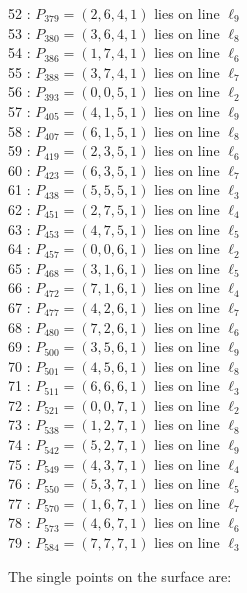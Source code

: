 \documentclass{article}
\begin{document}
{\begin{multicols}{2}
52 : $P_{379}=( 2, 6, 4, 1 )$ lies on line $\ell_{9}$\\
53 : $P_{380}=( 3, 6, 4, 1 )$ lies on line $\ell_{8}$\\
54 : $P_{386}=( 1, 7, 4, 1 )$ lies on line $\ell_{6}$\\
55 : $P_{388}=( 3, 7, 4, 1 )$ lies on line $\ell_{7}$\\
56 : $P_{393}=( 0, 0, 5, 1 )$ lies on line $\ell_{2}$\\
57 : $P_{405}=( 4, 1, 5, 1 )$ lies on line $\ell_{9}$\\
58 : $P_{407}=( 6, 1, 5, 1 )$ lies on line $\ell_{8}$\\
59 : $P_{419}=( 2, 3, 5, 1 )$ lies on line $\ell_{6}$\\
60 : $P_{423}=( 6, 3, 5, 1 )$ lies on line $\ell_{7}$\\
61 : $P_{438}=( 5, 5, 5, 1 )$ lies on line $\ell_{3}$\\
62 : $P_{451}=( 2, 7, 5, 1 )$ lies on line $\ell_{4}$\\
63 : $P_{453}=( 4, 7, 5, 1 )$ lies on line $\ell_{5}$\\
64 : $P_{457}=( 0, 0, 6, 1 )$ lies on line $\ell_{2}$\\
65 : $P_{468}=( 3, 1, 6, 1 )$ lies on line $\ell_{5}$\\
66 : $P_{472}=( 7, 1, 6, 1 )$ lies on line $\ell_{4}$\\
67 : $P_{477}=( 4, 2, 6, 1 )$ lies on line $\ell_{7}$\\
68 : $P_{480}=( 7, 2, 6, 1 )$ lies on line $\ell_{6}$\\
69 : $P_{500}=( 3, 5, 6, 1 )$ lies on line $\ell_{9}$\\
70 : $P_{501}=( 4, 5, 6, 1 )$ lies on line $\ell_{8}$\\
71 : $P_{511}=( 6, 6, 6, 1 )$ lies on line $\ell_{3}$\\
72 : $P_{521}=( 0, 0, 7, 1 )$ lies on line $\ell_{2}$\\
73 : $P_{538}=( 1, 2, 7, 1 )$ lies on line $\ell_{8}$\\
74 : $P_{542}=( 5, 2, 7, 1 )$ lies on line $\ell_{9}$\\
75 : $P_{549}=( 4, 3, 7, 1 )$ lies on line $\ell_{4}$\\
76 : $P_{550}=( 5, 3, 7, 1 )$ lies on line $\ell_{5}$\\
77 : $P_{570}=( 1, 6, 7, 1 )$ lies on line $\ell_{7}$\\
78 : $P_{573}=( 4, 6, 7, 1 )$ lies on line $\ell_{6}$\\
79 : $P_{584}=( 7, 7, 7, 1 )$ lies on line $\ell_{3}$\\
\end{multicols}
The single points on the surface are:\\
}
\end{document}
